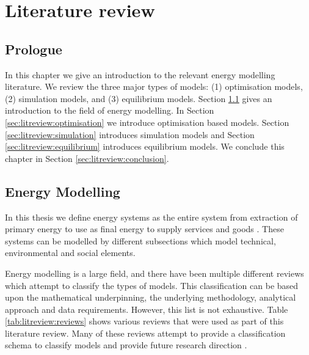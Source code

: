 \chapter{Literature review}
\label{chapter:litreview}
\ifpdf
    \graphicspath{{Chapter3/Figs/Raster/}{Chapter3/Figs/PDF/}{Chapter3/Figs/}}
\else
    \graphicspath{{Chapter3/Figs/Vector/}{Chapter3/Figs/}}
\fi

\section*{Prologue}

In this chapter we give an introduction to the relevant energy modelling literature. We review the three major types of models: (1) optimisation models, (2) simulation models, and (3) equilibrium models. Section \ref{sec:litreview:energymodelling} gives an introduction to the field of energy modelling. In Section \ref{sec:litreview:optimisation} we introduce optimisation based models. Section \ref{sec:litreview:simulation} introduces simulation models and Section \ref{sec:litreview:equilibrium} introduces equilibrium models. We conclude this chapter in Section \ref{sec:litreview:conclusion}.

\section{Energy Modelling}
\label{sec:litreview:energymodelling}

In this thesis we define energy systems as the entire system from extraction of primary energy to use as final energy to supply services and goods \cite{Pfenninger2014b}. These systems can be modelled by different subsections which model technical, environmental and social elements. 

Energy modelling is a large field, and there have been multiple different reviews which attempt to classify the types of models. This classification can be based upon the mathematical underpinning, the underlying methodology, analytical approach and data requirements. However, this list is not exhaustive. Table \ref{tab:litreview:reviews} shows various reviews that were used as part of this literature review. Many of these reviews attempt to provide a classification schema to classify models \cite{Hall2016a, Savvidis2019a} and provide future research direction \cite{Pfenninger2014b,Savvidis2019a}. 


